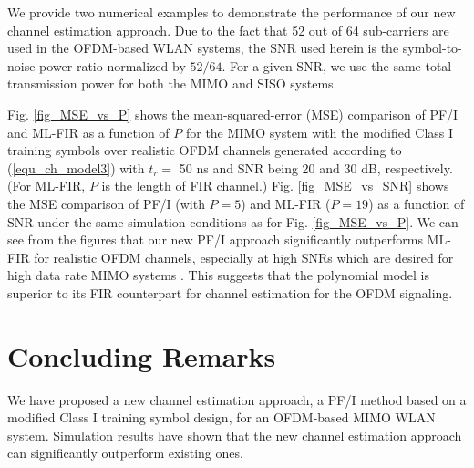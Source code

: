 \documentclass[11pt,draftnofoot,onecolumn]{IEEEtran}
\def\spacingset#1{\def\baselinestretch{#1}\small\normalsize}
\begin{document}
We provide two numerical examples to demonstrate the performance of
our new channel estimation approach. Due to the fact that 52 out of
64 sub-carriers are used in the OFDM-based WLAN systems, the SNR
used herein is the symbol-to-noise-power ratio normalized by
$52/64$. For a given SNR, we use the same total transmission power
for both the MIMO and SISO systems.

Fig. \ref{fig_MSE_vs_P} shows the
mean-squared-error (MSE) comparison of PF/I
and ML-FIR as a function of
$P$ for the MIMO system with the modified Class I training symbols over
realistic OFDM channels generated according to (\ref{equ_ch_model3})
with $t_r = $ 50 ns and SNR being 20 and 30 dB, respectively.
(For ML-FIR, $P$ is the length of FIR channel.)
Fig. \ref{fig_MSE_vs_SNR} shows the
MSE comparison of PF/I (with $P = 5$)
and ML-FIR ($P=19$) as a function of SNR under the same simulation
conditions as for Fig. \ref{fig_MSE_vs_P}.
We can see from the figures that
our new PF/I approach significantly outperforms
ML-FIR for realistic OFDM channels, especially
at high SNRs which are desired for high data rate MIMO systems
\cite{LiuLi2003c}. This suggests that the polynomial
model is superior to its FIR counterpart
for channel estimation for the OFDM signaling.


\section{Concluding Remarks}
\label{sec6}

We have proposed a new channel estimation approach,
a PF/I method based on a modified Class I training symbol design,
for an OFDM-based MIMO WLAN system.
Simulation results have
shown that the new channel estimation approach can significantly
outperform existing ones.



%
\end{document}
